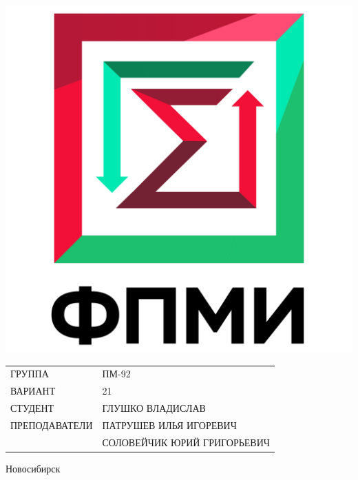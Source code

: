 \documentclass[12pt,a4paper]{article}
\begin{document}
\begin{center}
    \begin{minipage}{0.3 \textwidth}
        \includegraphics[scale=0.2]{images/fami_emblem}
    \end{minipage}%
    \hfill
    \begin{minipage}{0.7 \textwidth}
        \begin{flushleft}
            \renewcommand{\arraystretch}{2.0}
            \begin{tabular}{ll}
                \uppercase{Группа}        & ПМ-92                                  \\
                \uppercase{Вариант}       & 21                                     \\
                \uppercase{Студент}       & \uppercase{Глушко Владислав}           \\
                \uppercase{Преподаватели} & \uppercase{Патрушев Илья Игоревич}     \\
                                          & \uppercase{Соловейчик Юрий Григорьевич}\\
            \end{tabular}
            \renewcommand{\arraystretch}{1.0}
        \end{flushleft}
    \end{minipage}%

    \begin{Large}
        \vspace{32mm}

        Новосибирск\\
        \end{Large}
    \end{center}
    \newpage
\end{document}

